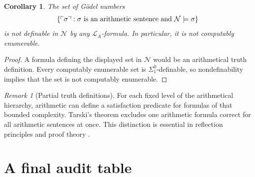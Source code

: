 \documentclass[11pt,oneside,openany]{book}
\theoremstyle{definition}
\theoremstyle{plain}
\newtheorem{corollary}[definition]{Corollary}
\theoremstyle{remark}
\newtheorem{remark}[definition]{Remark}
\DeclarePairedDelimiter{\set}{\lbrace}{\rbrace}
\newcommand{\Lang}{\mathcal{L}}
\newcommand{\entails}{\models}
\begin{document}
\begin{corollary}
The set of G\"odel numbers
\[
  \set{\ulcorner\sigma\urcorner:
  \sigma\text{ is an arithmetic sentence and }
  \mathcal N\entails\sigma}
\]
is not definable in \(\mathcal N\) by any \(\Lang_A\)-formula.  In
particular, it is not computably
enumerable.
\end{corollary}

\begin{proof}
A formula defining the displayed set in \(\mathcal N\) would be an
arithmetical truth
definition.  Every computably enumerable set is \(\Sigma^0_1\)-definable, so
nondefinability implies that the set is not computably enumerable.
\end{proof}

\begin{remark}[Partial truth definitions]
For each fixed level of the arithmetical hierarchy, arithmetic can define a
satisfaction predicate for formulas of that bounded complexity.  Tarski's
theorem excludes one arithmetic formula correct for all arithmetic sentences
at once.  This distinction is essential in reflection principles and proof
theory \cite{Tarski1983}.
\end{remark}

\section{A final audit table}
\label{sec:second-incompleteness-05}
\end{document}
